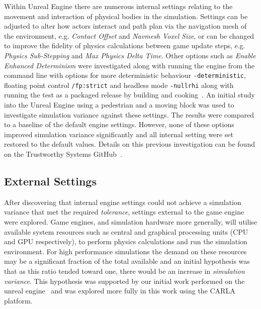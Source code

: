 \documentclass[letterpaper, 10 pt, journal, twoside]{IEEEtran}
\begin{document}
Within Unreal Engine there are numerous internal settings relating to the movement and interaction of physical bodies in the simulation. Settings can be adjusted to alter how actors interact and path plan via the navigation mesh of the environment, e.g. \textit{Contact Offset} and \textit{Navmesh Voxel Size}, or can be changed to improve the fidelity of physics calculations between game update steps, e.g. \textit{Physics Sub-Stepping} and \textit{Max Physics Delta Time}. Other options such as \textit{Enable Enhanced Determinism} were investigated along with running the engine from the command line with options for more deterministic behaviour \texttt{-deterministic}, floating point control \texttt{/fp:strict} and headless mode \texttt{-nullrhi} along with running the test as a packaged release by building and cooking~\cite{releasing_project}.
An initial study into the Unreal Engine using a pedestrian and a moving block was used to investigate simulation variance against these settings. The results were compared to a baseline of the default engine settings. 
%
However, none of these options improved simulation variance significantly and all internal setting were set restored to the default values. Details on this previous investigation can be found on the Trustworthy Systems GitHub~\cite{TSLUnrealEngineTesting}.



\subsection{External Settings}

After discovering that internal engine settings could not achieve a simulation variance that met the required 
\textit{tolerance}, 
settings external to the game engine were explored. 
%
Game engines, and simulation hardware more generally, will utilise available system resources such as central and graphical processing units (CPU and GPU respectively), to perform physics calculations and run the simulation environment. 
%
For high performance simulations the demand on these resources may be a significant fraction of the total available and an initial hypothesis was that as this ratio tended toward one, there would be an increase in \textit{simulation variance}. This hypothesis was supported by our initial work performed on the unreal engine~\cite{TSLUnrealEngineTesting} and was explored more fully in this work using the CARLA platform.
\end{document}
